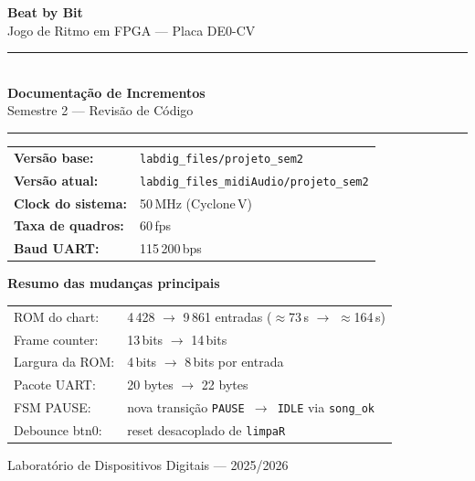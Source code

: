 \documentclass[12pt, a4paper]{article}
\begin{document}
\begin{titlepage}
    \centering
    \vspace*{2cm}

    {\Huge\bfseries\color{sectioncolor} Beat by Bit}\\[0.5em]
    {\large Jogo de Ritmo em FPGA — Placa DE0-CV}\\[2em]

    \rule{\linewidth}{1pt}\\[0.8em]
    {\LARGE\bfseries Documentação de Incrementos}\\[0.4em]
    {\large Semestre 2 — Revisão de Código}\\[0.8em]
    \rule{\linewidth}{1pt}

    \vspace{2em}

    \begin{tabular}{ll}
        \textbf{Versão base:}      & \texttt{labdig\_files/projeto\_sem2} \\[0.3em]
        \textbf{Versão atual:}     & \texttt{labdig\_files\_midiAudio/projeto\_sem2} \\[0.3em]
        \textbf{Clock do sistema:} & 50\,MHz (Cyclone\,V) \\[0.3em]
        \textbf{Taxa de quadros:}  & 60\,fps \\[0.3em]
        \textbf{Baud UART:}        & 115\,200\,bps \\
    \end{tabular}

    \vspace{3em}

    \begin{destaque}
    \centering
    \textbf{Resumo das mudanças principais}\\[0.5em]
    \begin{tabular}{ll}
        ROM do chart: & 4\,428 $\to$ 9\,861 entradas ($\approx$73\,s $\to$ $\approx$164\,s) \\
        Frame counter: & 13\,bits $\to$ 14\,bits \\
        Largura da ROM: & 4\,bits $\to$ 8\,bits por entrada \\
        Pacote UART: & 20 bytes $\to$ 22 bytes \\
        FSM PAUSE: & nova transição \texttt{PAUSE $\to$ IDLE} via \texttt{song\_ok} \\
        Debounce btn0: & reset desacoplado de \texttt{limpaR} \\
    \end{tabular}
    \end{destaque}

    \vfill
    {\small Laboratório de Dispositivos Digitais --- 2025/2026}
\end{titlepage}
\end{document}
